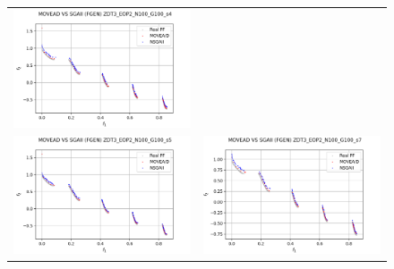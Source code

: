 \begin{figure}[H]
\begin{tabular}{c c}
    \includegraphics[scale=0.5]{figures/ZDT3_EOP2_N100_G100_T15/s4_comp.png}\\
    \includegraphics[scale=0.5]{figures/ZDT3_EOP2_N100_G100_T15/s5_comp.png} &
    \includegraphics[scale=0.5]{figures/ZDT3_EOP2_N100_G100_T15/s7_comp.png}\\

\end{tabular}
\end{figure}
